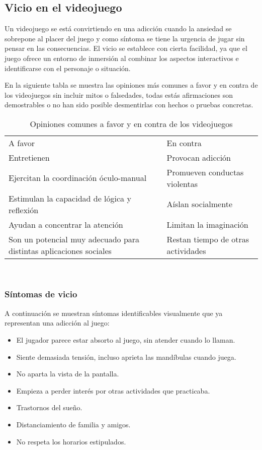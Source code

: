 \subsection{Vicio en el videojuego}\label{vicioVJ}
Un videojuego se está convirtiendo en una adicción cuando la ansiedad se sobrepone al placer del juego y como síntoma se tiene la urgencia de jugar sin pensar en las consecuencias. El vicio se establece con cierta facilidad, ya que el juego ofrece un entorno de inmersión al combinar los aspectos interactivos e identificarse con el personaje o situación.

En la siguiente tabla se muestra las opiniones más comunes a favor y en contra de los videojuegos sin incluir mitos o falsedades, todas estás afirmaciones son demostrables o no han sido posible desmentirlas con hechos o pruebas concretas.
\begin{table}[htbp]
	\centering
	\caption{Opiniones comunes a favor y en contra de los videojuegos}
	\label{tab:tablaOpinión}
	\begin{tabular}{ll}
		A favor                                                            & En contra                          \\
		Entretienen                                                        & Provocan adicción                  \\
		Ejercitan la coordinación óculo-manual                             & Promueven conductas violentas      \\
		Estimulan la capacidad de lógica y reflexión                       & Aíslan socialmente                 \\
		Ayudan a concentrar la atención                                    & Limitan la imaginación             \\
		Son un potencial muy adecuado para distintas aplicaciones sociales & Restan tiempo de otras actividades
	\end{tabular}
\end{table}
\\[1pt]
	
\subsubsection{Síntomas de vicio}
A continuación se muestran síntomas identificables visualmente que ya representan una adicción al juego:
\begin{itemize}
	\item El jugador parece estar absorto al juego, sin atender cuando lo llaman.
	\item Siente demasiada tensión, incluso aprieta las mandíbulas cuando juega.
	\item No aparta la vista de la pantalla.
	\item Empieza a perder interés por otras actividades que practicaba.
	\item Trastornos del sueño.
	\item Distanciamiento de familia y amigos.
	\item No respeta los horarios estipulados.
\end{itemize}
\\[1pt]

